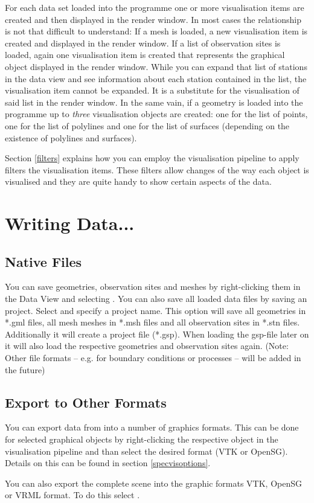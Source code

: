 For each data set loaded into the programme one or more visualisation items are created and then displayed in the render window. In most cases the relationship is not that difficult to understand: If a mesh is loaded, a new visualisation item is created and displayed in the render window. If a list of observation sites is loaded, again one visualisation item is created that represents the graphical object displayed in the render window. While you can expand that list of stations in the data view and see information about each station contained in the list, the visualisation item cannot be expanded. It is a substitute for the visualisation of said list in the render window. In the same vain, if a geometry is loaded into the programme up to \emph{three} visualisation objects are created: one for the list of points, one for the list of polylines and one for the list of surfaces (depending on the existence of polylines and surfaces).

Section \ref{filters} explains how you can employ the visualisation pipeline to apply filters the visualisation items. These filters allow changes of the way each object is visualised and they are quite handy to show certain aspects of the data.

\section{Writing Data...}

\subsection{Native Files}
You can save geometries, observation sites and meshes by right-clicking them in the Data View and selecting . You can also save all loaded data files by saving an \ogs project. Select  and specify a project name. This option will save all geometries in *.gml files, all mesh meshes in *.msh files and all observation sites in *.stn files. Additionally it will create a project file (*.gsp). When loading the gsp-file later on it will also load the respective geometries and observation sites again. (Note: Other file formats -- e.g. for boundary conditions or processes -- will be added in the future)

\subsection{Export to Other Formats}

You can export data from \ogs into a number of graphics formats. This can be done for selected graphical objects by right-clicking the respective object in the visualisation pipeline and than select the desired format (VTK or OpenSG). Details on this can be found in section \ref{specvisoptions}.

You can also export the complete scene into the graphic formats VTK, OpenSG or VRML format. To do this select . 